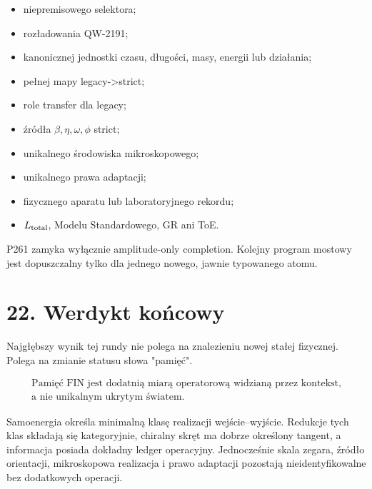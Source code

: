\documentclass[11pt,a4paper,openany]{report}
\begin{document}
\begin{itemize}
\item 
niepremisowego selektora;

\item 
rozładowania QW-2191;

\item 
kanonicznej jednostki czasu, długości, masy, energii lub działania;

\item 
pełnej mapy legacy->strict;

\item 
role transfer dla legacy;

\item 
źródła \(\beta,\eta,\omega,\phi\) strict;

\item 
unikalnego środowiska mikroskopowego;

\item 
unikalnego prawa adaptacji;

\item 
fizycznego aparatu lub laboratoryjnego rekordu;

\item 
\(L_{\rm total}\), Modelu Standardowego, GR ani ToE.

\end{itemize}

P261 zamyka wyłącznie amplitude-only completion. Kolejny program mostowy jest dopuszczalny tylko dla jednego nowego, jawnie typowanego atomu.

\chapter{22. Werdykt końcowy}

Najgłębszy wynik tej rundy nie polega na znalezieniu nowej stałej fizycznej. Polega na zmianie statusu słowa "pamięć".

\[
\boxed{
\begin{gathered}
\text{Pamięć FIN jest dodatnią miarą operatorową widzianą przez kontekst,}\\
\text{a nie unikalnym ukrytym światem.}
\end{gathered}
}
\]

Samoenergia określa minimalną klasę realizacji wejście--wyjście. Redukcje tych klas składają się kategoryjnie, chiralny skręt ma dobrze określony tangent, a informacja posiada dokładny ledger operacyjny. Jednocześnie skala zegara, źródło orientacji, mikroskopowa realizacja i prawo adaptacji pozostają nieidentyfikowalne bez dodatkowych operacji.
\end{document}
